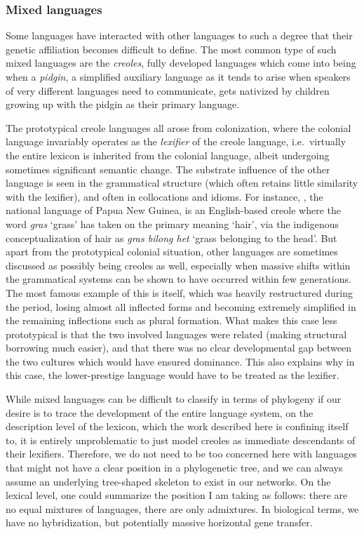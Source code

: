 \largerpage
\subsubsection{Mixed languages}
Some languages have interacted with other languages to such a degree that their genetic affiliation becomes difficult to define. The most common type of such mixed languages are the \textit{creoles}, fully developed languages which come into being when a \textit{pidgin}, a simplified auxiliary language as it tends to arise when speakers of very different languages need to communicate, gets nativized by children growing up with the pidgin as their primary language.

The prototypical creole languages all arose from colonization, where the colonial language invariably operates as the \textit{lexifier} of the creole language, i.e.\ virtually the entire lexicon is inherited from the colonial language, albeit undergoing sometimes significant semantic change. The substrate influence of the other language is seen in the grammatical structure (which often retains little similarity with the lexifier), and often in collocations and idioms. For instance, , the national language of Papua New Guinea, is an English-based creole where the word \textit{gras} `grass' has taken on the primary meaning `hair', via the indigenous conceptualization of hair as \textit{gras bilong het} `grass belonging to the head'. But apart from the prototypical colonial situation, other languages are sometimes discussed as possibly being creoles as well, especially when massive shifts within the grammatical systems can be shown to have occurred within few generations. The most famous example 
of this is  itself, which was heavily restructured during the  period, losing almost all inflected forms and becoming extremely simplified in the remaining inflections such as plural formation. What makes this case less prototypical is that the two involved languages were related (making structural borrowing much easier), and that there was no clear developmental gap between the two cultures which would have ensured dominance. This also explains why in this case, the lower-prestige language would have to be treated as the lexifier.

While mixed languages can be difficult to classify in terms of phylogeny if our desire is to trace the development of the entire language system, on the description level of the lexicon, which the work described here is confining itself to, it is entirely unproblematic to just model creoles as immediate descendants of their lexifiers. Therefore, we do not need to be too concerned here with languages that might not have a clear position in a phylogenetic tree, and we can always assume an underlying tree-shaped skeleton to exist in our networks. On the lexical level, one could summarize the position I am taking as follows: there are no equal mixtures of languages, there are only admixtures. In biological terms, we have no hybridization, but potentially massive horizontal gene transfer.

